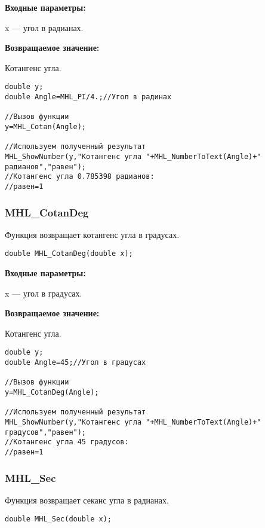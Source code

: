 \documentclass[a4paper,12pt]{article}
\begin{document}
\textbf{Входные параметры:}

 x --- угол в радианах.

\textbf{Возвращаемое значение:}

Котангенс угла.


\begin{lstlisting}[label=code_use_MHL_Cotan,caption=Пример использования]
double y;
double Angle=MHL_PI/4.;//Угол в радинах

//Вызов функции
y=MHL_Cotan(Angle);

//Используем полученный результат
MHL_ShowNumber(y,"Котангенс угла "+MHL_NumberToText(Angle)+" радианов","равен");
//Котангенс угла 0.785398 радианов:
//равен=1
\end{lstlisting}

\subsubsection{MHL\_CotanDeg}\label{MHL_CotanDeg}

Функция возвращает котангенс угла в градусах.


\begin{lstlisting}[label=code_syntax_MHL_CotanDeg,caption=Синтаксис]
double MHL_CotanDeg(double x);
\end{lstlisting}

\textbf{Входные параметры:}

 x --- угол в градусах.

\textbf{Возвращаемое значение:}

Котангенс угла.


\begin{lstlisting}[label=code_use_MHL_CotanDeg,caption=Пример использования]
double y;
double Angle=45;//Угол в градусах

//Вызов функции
y=MHL_CotanDeg(Angle);

//Используем полученный результат
MHL_ShowNumber(y,"Котангенс угла "+MHL_NumberToText(Angle)+" градусов","равен");
//Котангенс угла 45 градусов:
//равен=1
\end{lstlisting}

\subsubsection{MHL\_Sec}\label{MHL_Sec}

Функция возвращает секанс угла в радианах.


\begin{lstlisting}[label=code_syntax_MHL_Sec,caption=Синтаксис]
double MHL_Sec(double x);
\end{lstlisting}
\end{document}
